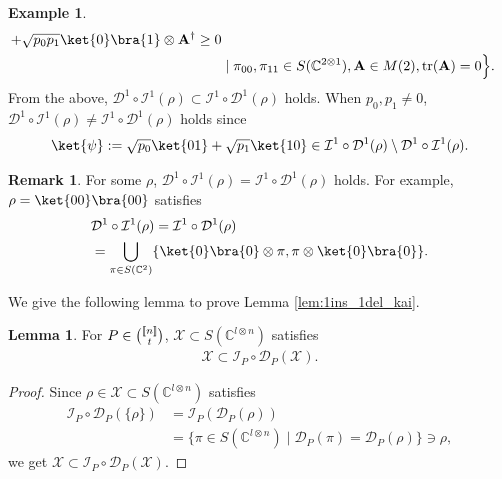 \documentclass[reprint,amsmath,amssymb,aps,]{revtex4-2}
\theoremstyle{definition}
\newtheorem{exam}{Example}
\newtheorem{lem}{Lemma}
\newtheorem{rem}{Remark}
\newcommand{\SET}[1]{\mathbb{#1}}
\newcommand{\C}{\SET{C}}
\newcommand{\1}{\mbox{1}\hspace{-0.25em}\mbox{l}}%
\newcommand{\setint}[1]{[\hspace{-0.5mm}[#1]\hspace{-0.5mm}]}
\newcommand{\subint}[2]{\tbinom{\setint{#1}}{#2}}
\newcommand{\mat}[1]{\mathbf{#1}}
\newcommand{\pure}[2]{\C^{#1 \otimes #2}}
\newcommand{\state}[2]{S(\pure{#1}{#2})}
\newcommand{\QU}[1]{\mathcal{#1}}
\begin{document}
\begin{exam}
\begin{align*}
    + \sqrt{p_0p_1} \ket{0}\bra{1} \otimes \mat{A}^\dagger \ge 0\\
    &\mid
    \pi_{00}, \pi_{11} \in \state{2}{1},
    \mat{A} \in M(2),
    \text{tr}(\mat{A}) = 0
    \Big\}.
  \end{align*}
  From the above,
  $\QU{D}^1 \circ \QU{I}^1(\rho) \subset \QU{I}^1 \circ \QU{D}^1(\rho)$ holds.
  When $p_0, p_1 \neq 0$,
  $\QU{D}^1 \circ \QU{I}^1(\rho) \neq \QU{I}^1 \circ \QU{D}^1(\rho)$ holds
  since
  \begin{align*}
    \ket{\psi}
    :=
    \sqrt{p_0} 
    \ket{01}
    +
    \sqrt{p_1} 
    \ket{10}
    \in
    \QU{I}^1 \circ \QU{D}^1(\rho) \setminus \QU{D}^1 \circ \QU{I}^1(\rho).
  \end{align*} 
\end{exam}

\begin{rem}
  For some $\rho$,
  $\QU{D}^1 \circ \QU{I}^1(\rho) = \QU{I}^1 \circ \QU{D}^1(\rho)$ holds.
  For example,
  $\rho = \ket{00}\bra{00}$ satisfies
  \begin{align*}
    &\QU{D}^1 \circ \QU{I}^1(\rho)
    =
    \QU{I}^1 \circ \QU{D}^1(\rho)\\
    &=
    \bigcup_{\pi \in S(\C^2)}
    \{
    \ket{0}\bra{0} \otimes \pi,
    \pi \otimes \ket{0}\bra{0} \}.
  \end{align*}
\end{rem}

We give the following lemma to prove Lemma \ref{lem:1ins_1del_kai}.

\begin{lem}
  \label{lem_ID=non}
  For $P \in \subint{n}{t}$,
  $\QU{X} \subset \state{l}{n}$ satisfies
  \begin{align*}
    \QU{X}
    \subset
    \QU{I}_P \circ \QU{D}_P(\QU{X}).
  \end{align*} 
\end{lem}
\begin{proof}
  Since $\rho \in \QU{X} \subset \state{l}{n}$ satisfies
  \begin{align*}
    \QU{I}_P \circ \QU{D}_P(\{\rho\})
    &=
    \QU{I}_P( \QU{D}_P( \rho ) )\\
    &=
    \{
    \pi \in \state{l}{n}
    \mid
    \QU{D}_P(\pi) = \QU{D}_P(\rho)
    \}
    \ni
    \rho,
  \end{align*}
  we get
  $\QU{X} \subset \QU{I}_P \circ \QU{D}_P(\QU{X})$.
\end{proof}
\end{document}

